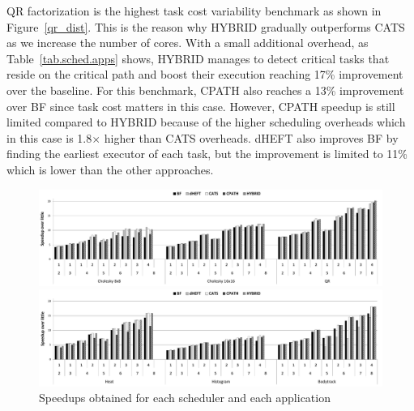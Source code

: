 
QR factorization is the highest task cost variability benchmark as shown in Figure~\ref{qr_dist}.
This is the reason why HYBRID gradually outperforms CATS as we increase the number of cores.
With a small additional overhead,
as Table~\ref{tab.sched.apps} shows, HYBRID manages to detect critical tasks that reside on the critical path and boost their execution reaching 17\% improvement over the baseline.
For this benchmark, CPATH also reaches a 13\% improvement over BF since task cost matters in this case. 
However, CPATH speedup is still limited compared to HYBRID because of the higher scheduling overheads which in this case is 1.8$\times$ higher than CATS overheads.
dHEFT also improves BF by finding the earliest executor of each task, but the improvement is limited to 11\% which is lower than the other approaches.
\begin{figure}[!t]
	\includegraphics[width=\textwidth]{images/speedup_apps1.pdf}
	\vspace{-0.4cm}
	
	\includegraphics[width=\textwidth]{images/speedup_apps2.pdf}
	\caption{Speedups obtained for each scheduler and each application}
	\label{speedup}
	\vspace{-0.4cm}
\end{figure}  


